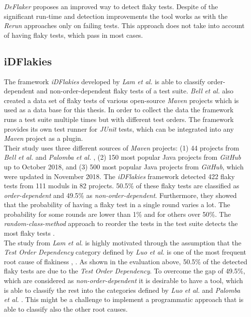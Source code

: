 \documentclass{seal_thesis}
\begin{document}
\noindent \textit{DeFlaker} proposes an improved way to detect flaky tests. Despite of the significant run-time and detection improvements the tool works as with the \textit{Rerun} approaches only on failing tests. This approach does not take into account of having flaky tests, which pass in most cases.

\subsection{iDFlakies}
The framework \textit{iDFlakies} developed by \textit{Lam et al.}\cite{lam19} is able to classify order-dependent and non-order-dependent flaky tests of a test suite. \textit{Bell et al.} also created a data set of flaky tests of various open-source \textit{Maven} projects which is used as a data base for this thesis. In order to collect the data the framework runs a test suite multiple times but with different test orders. The framework provides its own test runner for \textit{JUnit} tests, which can be integrated into any \textit{Maven} project as a plugin. \\

\noindent Their study uses three different sources of \textit{Maven} projects: (1) 44 projects from \textit{Bell et al.} \cite{bell18} and \textit{Palomba et al.} \cite{palomba17}, (2) 150 most popular Java projects from \textit{GitHub} \cite{github} up to October 2018, and (3) 500 most popular Java projects from \textit{GitHub}, which were updated in November 2018. The \textit{iDFlakies} framework detected 422 flaky tests from 111 moduls in 82 projects. 50.5\% of these flaky tests are classified as \textit{order-dependent} and 49.5\% as \textit{non-order-dependent}. Furthermore, they showed that the probability of having a flaky test in a single round varies a lot. The probability for some rounds are lower than 1\% and for others over 50\%. The \textit{random-class-method} approach to reorder the tests in the test suite detects the most flaky tests \cite{lam19}. \\

\noindent The study from \textit{Lam et al.} \cite{lam19} is highly motivated through the assumption that the \textit{Test Order Dependency} category defined by \textit{Luo et al.} \cite{luo14} is one of the most frequent root cause of flakiness \cite{luo14}, \cite{palomba17}. As shown in the evaluation above, 50.5\% of the detected flaky tests are due to the \textit{Test Order Dependency}. To overcome the gap of 49.5\%, which are considered as \textit{non-order-dependent} it is desirable to have a tool, which is able to classify the rest into the categories defined by \textit{Luo et al.} \cite{luo14} and \textit{Palomba et al.} \cite{palomba17}. This might be a challenge to implement a programmatic approach that is able to classify also the other root causes. \\
\end{document}
